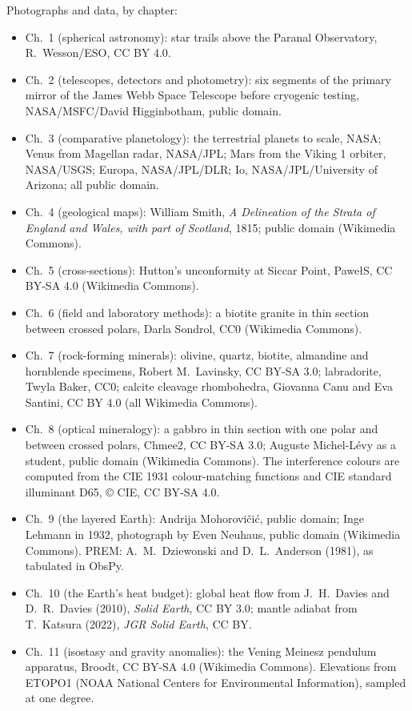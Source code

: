 \bigskip
\noindent Photographs and data, by chapter:
\begin{itemize}\small
  \item Ch.~1 (spherical astronomy): star trails above the Paranal Observatory, R.~Wesson/ESO, CC BY 4.0.
  \item Ch.~2 (telescopes, detectors and photometry): six segments of the primary mirror of the James Webb Space Telescope before cryogenic testing, NASA/MSFC/David Higginbotham, public domain.
  \item Ch.~3 (comparative planetology): the terrestrial planets to scale, NASA; Venus from Magellan radar, NASA/JPL; Mars from the Viking 1 orbiter, NASA/USGS; Europa, NASA/JPL/DLR; Io, NASA/JPL/University of Arizona; all public domain.
  \item Ch.~4 (geological maps): William Smith, \emph{A Delineation of the Strata of England and Wales, with part of Scotland}, 1815; public domain (Wikimedia Commons).
  \item Ch.~5 (cross-sections): Hutton's unconformity at Siccar Point, PawełS, CC BY-SA 4.0 (Wikimedia Commons).
  \item Ch.~6 (field and laboratory methods): a biotite granite in thin section between crossed polars, Darla Sondrol, CC0 (Wikimedia Commons).
  \item Ch.~7 (rock-forming minerals): olivine, quartz, biotite, almandine and hornblende specimens, Robert M.~Lavinsky, CC BY-SA 3.0; labradorite, Twyla Baker, CC0; calcite cleavage rhombohedra, Giovanna Canu and Eva Santini, CC BY 4.0 (all Wikimedia Commons).
  \item Ch.~8 (optical mineralogy): a gabbro in thin section with one polar and between crossed polars, Chmee2, CC BY-SA 3.0; Auguste Michel-Lévy as a student, public domain (Wikimedia Commons). The interference colours are computed from the CIE 1931 colour-matching functions and CIE standard illuminant D65, \copyright{} CIE, CC BY-SA 4.0.
  \item Ch.~9 (the layered Earth): Andrija Mohorovičić, public domain; Inge Lehmann in 1932, photograph by Even Neuhaus, public domain (Wikimedia Commons). PREM: A.~M.~Dziewonski and D.~L.~Anderson (1981), as tabulated in ObsPy.
  \item Ch.~10 (the Earth's heat budget): global heat flow from J.~H.~Davies and D.~R.~Davies (2010), \emph{Solid Earth}, CC BY 3.0; mantle adiabat from T.~Katsura (2022), \emph{JGR Solid Earth}, CC BY.
  \item Ch.~11 (isostasy and gravity anomalies): the Vening Meinesz pendulum apparatus, Broodt, CC BY-SA 4.0 (Wikimedia Commons). Elevations from ETOPO1 (NOAA National Centers for Environmental Information), sampled at one degree.

\end{itemize}
